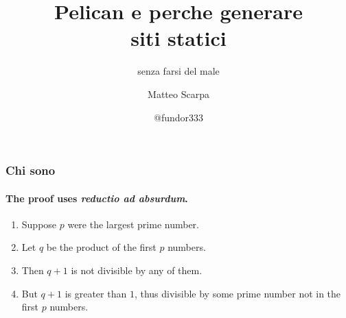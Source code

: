 \documentclass[x11names, svgnames]{beamer}
\title{Pelican e perche generare\\ siti statici}
\subtitle{senza farsi del male}
\author{Matteo Scarpa}
\date{@fundor333}
\begin{document}
	\frame{\maketitle}
	
	\begin{frame}
		\frametitle{Chi sono}
		\framesubtitle{The proof uses \textit{reductio ad absurdum}.}

			\begin{enumerate}
				\item Suppose $p$ were the largest prime number.
				\item Let $q$ be the product of the first $p$ numbers.
				\item Then $q+1$ is not divisible by any of them.
				\item But $q + 1$ is greater than $1$, thus divisible by some prime number not in the first $p$ numbers.\qedhere
			\end{enumerate}

	\end{frame}
\end{document}
